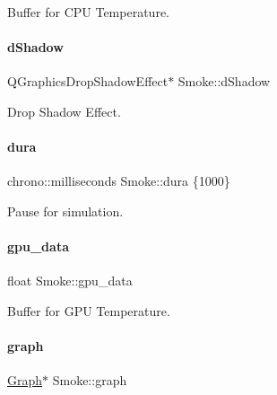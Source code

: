 Buffer for C\+PU Temperature. 

\mbox{\label{classSmoke_a26f011df30f860db285ef97713ca7989}} 
\paragraph{\texorpdfstring{dShadow}{dShadow}}
{\footnotesize\ttfamily Q\+Graphics\+Drop\+Shadow\+Effect$\ast$ Smoke\+::d\+Shadow\hspace{0.3cm}{\ttfamily [private]}}



Drop Shadow Effect. 

\mbox{\label{classSmoke_ae62660aa3919c7a01b5a0c3ad5ec1715}} 
\paragraph{\texorpdfstring{dura}{dura}}
{\footnotesize\ttfamily chrono\+::milliseconds Smoke\+::dura \{1000\}\hspace{0.3cm}{\ttfamily [private]}}



Pause for simulation. 

\mbox{\label{classSmoke_afcd49fb97c3573ec4c779346d4be1c95}} 
\paragraph{\texorpdfstring{gpu\_data}{gpu\_data}}
{\footnotesize\ttfamily float Smoke\+::gpu\+\_\+data\hspace{0.3cm}{\ttfamily [private]}}



Buffer for G\+PU Temperature. 

\mbox{\label{classSmoke_a7a2faa3ba32e51c7eb4212622f31ed79}} 
\paragraph{\texorpdfstring{graph}{graph}}
{\footnotesize\ttfamily \mbox{\hyperlink{classGraph}{Graph}}$\ast$ Smoke\+::graph\hspace{0.3cm}{\ttfamily [private]}}



